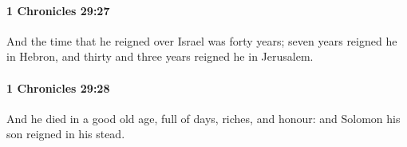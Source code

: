 		\paragraph{1 Chronicles 29:27} %
			\label{1CHRONICLES-29-27}

			And the time that he reigned over Israel was forty years; seven years reigned he in Hebron, and thirty and three years reigned he in Jerusalem.


		\paragraph{1 Chronicles 29:28} %
			\label{1CHRONICLES-29-28}

			And he died in a good old age, full of days, riches, and honour: and Solomon his son reigned in his stead.


